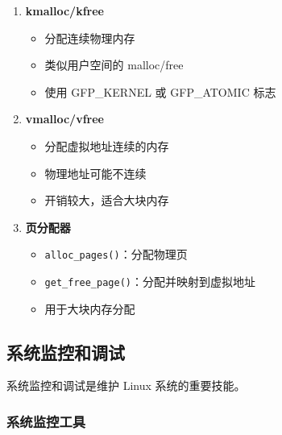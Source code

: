 \begin{enumerate}
  \item \textbf{kmalloc/kfree}
    \begin{itemize}
      \item 分配连续物理内存
      \item 类似用户空间的 malloc/free
      \item 使用 GFP\_KERNEL 或 GFP\_ATOMIC 标志
    \end{itemize}

  \item \textbf{vmalloc/vfree}
    \begin{itemize}
      \item 分配虚拟地址连续的内存
      \item 物理地址可能不连续
      \item 开销较大，适合大块内存
    \end{itemize}

  \item \textbf{页分配器}
    \begin{itemize}
      \item \texttt{alloc\_pages()}：分配物理页
      \item \texttt{get\_free\_page()}：分配并映射到虚拟地址
      \item 用于大块内存分配
    \end{itemize}
\end{enumerate}

\subsection{系统监控和调试}

系统监控和调试是维护 Linux 系统的重要技能。

\subsubsection{系统监控工具}

